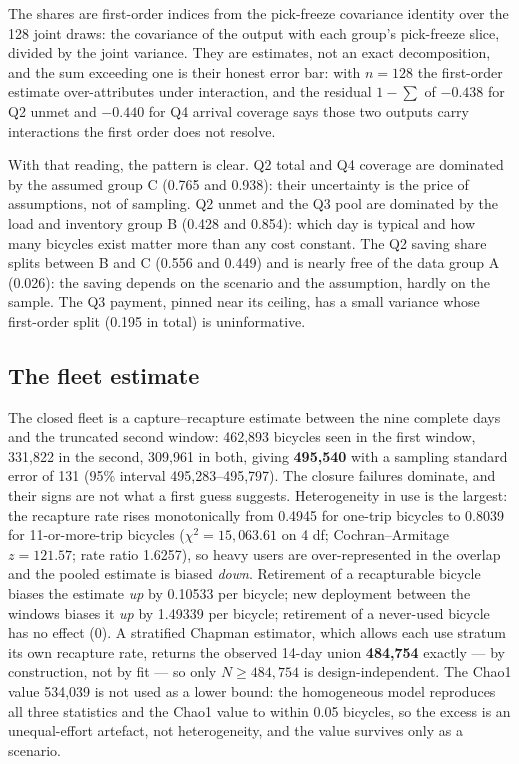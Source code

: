 The shares are first-order indices from the pick-freeze covariance identity over the
128 joint draws: the covariance of the output with each group's pick-freeze slice,
divided by the joint variance. They are estimates, not an exact decomposition, and the
sum exceeding one is their honest error bar: with $n=128$ the first-order estimate
over-attributes under interaction, and the residual $1-\sum$ of $-0.438$ for Q2 unmet and
$-0.440$ for Q4 arrival coverage says those two outputs carry interactions the first
order does not resolve.

With that reading, the pattern is clear. Q2 total and Q4 coverage are dominated by the
assumed group C (0.765 and 0.938): their uncertainty is the price of assumptions, not of
sampling. Q2 unmet and the Q3 pool are dominated by the load and inventory group B
(0.428 and 0.854): which day is typical and how many bicycles exist matter more than any
cost constant. The Q2 saving share splits between B and C (0.556 and 0.449) and is
nearly free of the data group A (0.026): the saving depends on the scenario and the
assumption, hardly on the sample. The Q3 payment, pinned near its ceiling, has a small
variance whose first-order split (0.195 in total) is uninformative.

\subsection{The fleet estimate}

The closed fleet is a capture--recapture estimate between the nine complete days and
the truncated second window: 462,893 bicycles seen in the first window, 331,822 in the
second, 309,961 in both, giving \textbf{495,540} with a sampling standard error of 131
(95\% interval 495,283--495,797). The closure failures dominate, and their signs are
not what a first guess suggests. Heterogeneity in use is the largest: the
recapture rate rises monotonically from 0.4945 for one-trip bicycles to 0.8039 for
11-or-more-trip bicycles ($\chi^2=15{,}063.61$ on 4 df; Cochran--Armitage $z=121.57$;
rate ratio 1.6257), so heavy users are over-represented in the overlap and the pooled
estimate is biased \emph{down}. Retirement of a recapturable bicycle biases the estimate
\emph{up} by 0.10533 per bicycle; new deployment between the windows biases it \emph{up}
by 1.49339 per bicycle; retirement of a never-used bicycle has no effect (0). A
stratified Chapman estimator, which allows each use stratum its own recapture rate,
returns the observed 14-day union \textbf{484,754} exactly --- by construction, not by
fit --- so only $N\ge484{,}754$ is design-independent. The Chao1 value 534,039 is not
used as a lower bound: the homogeneous model reproduces all three statistics and
the Chao1 value to within 0.05 bicycles, so the excess is an unequal-effort artefact, not
heterogeneity, and the value survives only as a scenario.

